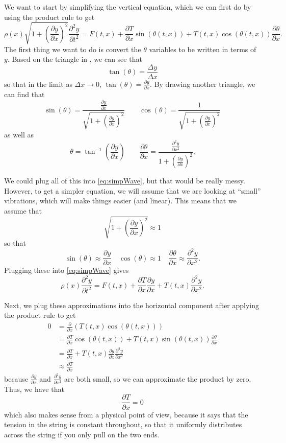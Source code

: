 \documentclass{ximera}
\begin{document}
We want to start by simplifying the vertical equation, which we can first do by using the product rule to get
\begin{equation} 
    \rho(x) \sqrt{1 + \left(\frac{\partial y}{\partial x} \right)^2} \frac{\partial^2 y}{\partial t^2} = F(t,x) +\frac{\partial T}{\partial x} \sin(\theta(t, x)) + T(t, x)\cos(\theta(t,x)) \frac{\partial \theta}{\partial x}. \label{eq:simpWave}
\end{equation}  The first thing we want to do is convert the $\theta$ variables to be written in terms of $y$. Based on the triangle in , we can see that
\[ 
    \tan(\theta) = \frac{\Delta y}{\Delta x} 
\] 
so that in the limit as $\Delta x \rightarrow 0$, $\tan(\theta) = \frac{\partial y}{\partial x}$. By drawing another triangle, we can find that
\[ 
    \sin(\theta) = \frac{\frac{\partial y}{\partial x}}{\sqrt{1 + \left(\frac{\partial y}{\partial x}\right)^2}} \qquad \cos(\theta) = \frac{1}{\sqrt{1 + \left( \frac{\partial y}{\partial x}\right)^2}} 
\] 
as well as
\[ 
    \theta = \tan^{-1}\left(\frac{\partial y}{\partial x}\right) \qquad \frac{\partial \theta}{\partial x} = \frac{\frac{\partial^2 y}{\partial x^2}}{1 + \left(\frac{\partial y}{\partial x}\right)^2}. 
\]

We could plug all of this into \eqref{eq:simpWave}, but that would be really messy. However, to get a simpler equation, we will assume that we are looking at ``small'' vibrations, which will make things easier (and linear). This means that we assume that 
\[ 
    \sqrt{1 + \left(\frac{\partial y}{\partial x}\right)^2} \approx 1 
\] 
so that
\[ 
    \sin(\theta) \approx \frac{\partial y}{\partial x} \quad \cos(\theta) \approx 1 \quad \frac{\partial \theta}{\partial x} \approx \frac{\partial^2 y}{\partial x^2}. 
\] 
Plugging these into \eqref{eq:simpWave} gives
\begin{equation} 
    \rho(x) \frac{\partial^2 y}{\partial t^2} = F(t,x) +\frac{\partial T}{\partial x} \frac{\partial y}{\partial x} + T(t, x)\frac{\partial^2 y}{\partial x^2}. \label{eq:simpWaveVert}
\end{equation} 

Next, we plug these approximations into the horizontal component after applying the product rule to get
\[ 
    \begin{split}
        0 &=  \frac{\partial}{\partial x} \left(T(t, x)\cos(\theta(t, x))\right) \\
        &= \frac{\partial T}{\partial x} \cos(\theta(t, x)) + T(t, x) \sin(\theta(t,x)) \frac{\partial \theta}{\partial x} \\
        &= \frac{\partial T}{\partial x} + T(t,x) \frac{\partial y}{\partial x} \frac{\partial^2 y}{\partial x^2} \\
        & \approx \frac{\partial T}{\partial x}
    \end{split}
\]
because $\frac{\partial y}{\partial x}$ and $\frac{\partial^2 y}{\partial x^2}$ are both small, so we can approximate the product by zero. Thus, we have that 
\[ 
    \frac{\partial T}{\partial x} = 0 
\] 
which also makes sense from a physical point of view, because it says that the tension in the string is constant throughout, so that it uniformly distributes across the string if you only pull on the two ends.
\end{document}
